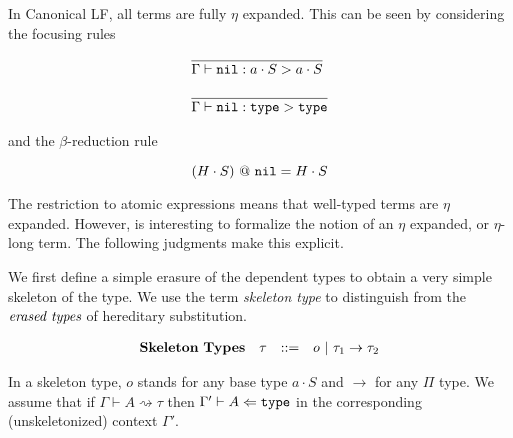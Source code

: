 \documentclass[11pt,twoside]{article}
\begin{document}
In Canonical LF, all terms are fully $\eta$ expanded.  This can be seen
by considering the focusing rules

$$
\begin{array}{lr}
\infer{\Focus{\Nil}{a\cdot S}{a\cdot S}}{}\\
\\
\infer{\Focus{\Nil}{\Type}{\Type}}{} 
\end{array} 
$$

and the $\beta$-reduction rule

$$
(H\cdot S)\App\Nil = H\cdot S
$$

The restriction to atomic expressions means that well-typed terms
are $\eta$ expanded.  However, is interesting to formalize the notion
of an $\eta$ expanded, or $\eta$-long term.  The following judgments
make this explicit.



We first define a simple erasure of the dependent types to obtain
a very simple skeleton of the type.  We use the term \emph{skeleton type}
to distinguish from the $\emph{erased types}$ of hereditary substitution.

\newcommand{\Skel}[3][\Gamma]{#1\vdash #2 \rightsquigarrow #3}
\newcommand{\SkBase}{o}
\newcommand{\tauskel}{\tau_1\to\tau_2\to\ldots\to\tau_n\to\SkBase}

\bigskip 
$$
\begin{array}{llll}
\mathbf{Skeleton\ Types} & \tau & ::= & \SkBase \Spb \tau_1\to\tau_2 \\
\end{array} 
$$
\bigskip 

In a skeleton type, $o$ stands for any base type $a\cdot S$ and $\to$ for any $\Pi$ type.
We assume that if $\Skel{A}{\tau}$ then $\CheckTy[\Gamma']{A}{\Type}$ in the corresponding
(unskeletonized) context $\Gamma'$.


\bigskip 
\framebox{$\Skel{A}{\tau}$}
\bigskip 

\end{document}
